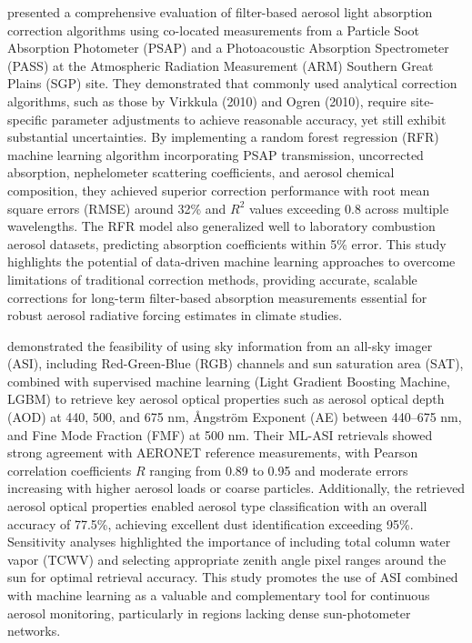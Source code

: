 \documentclass[11pt]{article}
\begin{document}
\citet{kumar2022correcting} presented a comprehensive evaluation of filter-based aerosol light absorption correction algorithms using co-located measurements from a Particle Soot Absorption Photometer (PSAP) and a Photoacoustic Absorption Spectrometer (PASS) at the Atmospheric Radiation Measurement (ARM) Southern Great Plains (SGP) site. They demonstrated that commonly used analytical correction algorithms, such as those by Virkkula (2010) and Ogren (2010), require site-specific parameter adjustments to achieve reasonable accuracy, yet still exhibit substantial uncertainties. By implementing a random forest regression (RFR) machine learning algorithm incorporating PSAP transmission, uncorrected absorption, nephelometer scattering coefficients, and aerosol chemical composition, they achieved superior correction performance with root mean square errors (RMSE) around 32\% and \(R^2\) values exceeding 0.8 across multiple wavelengths. The RFR model also generalized well to laboratory combustion aerosol datasets, predicting absorption coefficients within 5\% error. This study highlights the potential of data-driven machine learning approaches to overcome limitations of traditional correction methods, providing accurate, scalable corrections for long-term filter-based absorption measurements essential for robust aerosol radiative forcing estimates in climate studies.

\citet{logothetis2023aerosol} demonstrated the feasibility of using sky information from an all-sky imager (ASI), including Red-Green-Blue (RGB) channels and sun saturation area (SAT), combined with supervised machine learning (Light Gradient Boosting Machine, LGBM) to retrieve key aerosol optical properties such as aerosol optical depth (AOD) at 440, 500, and 675 nm, Ångström Exponent (AE) between 440–675 nm, and Fine Mode Fraction (FMF) at 500 nm. Their ML-ASI retrievals showed strong agreement with AERONET reference measurements, with Pearson correlation coefficients \(R\) ranging from 0.89 to 0.95 and moderate errors increasing with higher aerosol loads or coarse particles. Additionally, the retrieved aerosol optical properties enabled aerosol type classification with an overall accuracy of 77.5\%, achieving excellent dust identification exceeding 95\%. Sensitivity analyses highlighted the importance of including total column water vapor (TCWV) and selecting appropriate zenith angle pixel ranges around the sun for optimal retrieval accuracy. This study promotes the use of ASI combined with machine learning as a valuable and complementary tool for continuous aerosol monitoring, particularly in regions lacking dense sun-photometer networks.
\end{document}
